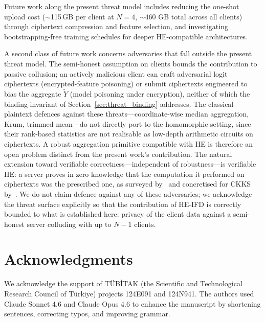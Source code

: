 Future work along the present threat model includes reducing the one-shot upload cost (${\sim}$115\,GB per client at $N{=}4$, $\sim 460$ GB total across all clients) through ciphertext compression and feature selection, and investigating bootstrapping-free training schedules for deeper HE-compatible architectures.

A second class of future work concerns adversaries that fall outside the present threat model. The semi-honest assumption on clients bounds the contribution to passive collusion; an actively malicious client can craft adversarial logit ciphertexts (encrypted-feature poisoning) or submit ciphertexts engineered to bias the aggregate $\widetilde{Y}$ (model poisoning under encryption), neither of which the binding invariant of Section~\ref{sec:threat_binding} addresses. The classical plaintext defences against these threats---coordinate-wise median aggregation, Krum, trimmed mean---do not directly port to the homomorphic setting, since their rank-based statistics are not realisable as low-depth arithmetic circuits on ciphertexts. A robust aggregation primitive compatible with HE is therefore an open problem distinct from the present work's contribution. The natural extension toward verifiable correctness---independent of robustness---is verifiable HE: a server proves in zero knowledge that the computation it performed on ciphertexts was the prescribed one, as surveyed by~\cite{viand2023verifiable} and concretised for CKKS by~\cite{atapoor2024vfhe}. We do not claim defence against any of these adversaries; we acknowledge the threat surface explicitly so that the contribution of HE-IFD is correctly bounded to what is established here: privacy of the client data against a semi-honest server colluding with up to $N{-}1$ clients. %

\section*{Acknowledgments}
We acknowledge the support of TÜBİTAK (the Scientific and Technological Research Council of Türkiye) projects 124E091 and 124N941. The authors used Claude Sonnet 4.6 and Claude Opus 4.6 to enhance the manuscript by shortening sentences, correcting typos, and improving grammar.
